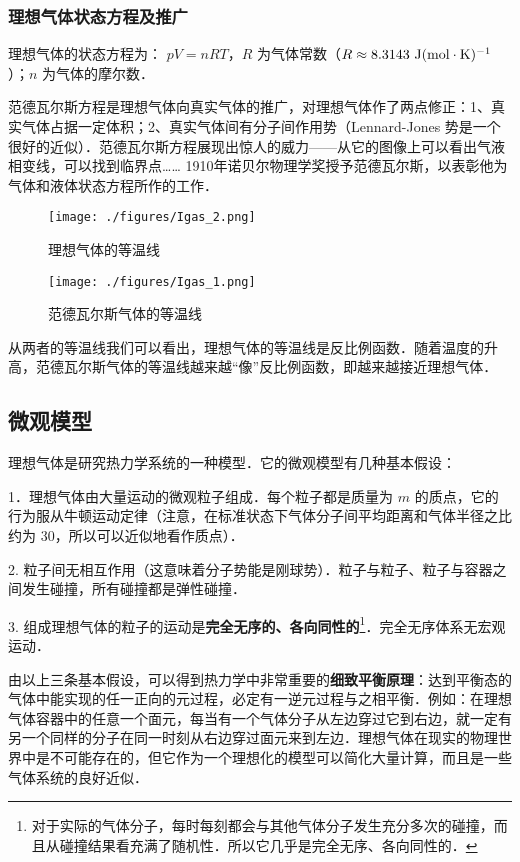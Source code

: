 \subsubsection{理想气体状态方程及推广}
理想气体的状态方程为： $pV=nRT$，$R$ 为气体常数（$R\approx 8.3143\ \rm{J}(\rm{mol\cdot K})^{-1}$）；$n$ 为气体的摩尔数．

范德瓦尔斯方程是理想气体向真实气体的推广，对理想气体作了两点修正：1、真实气体占据一定体积；2、真实气体间有分子间作用势（Lennard-Jones 势是一个很好的近似）．范德瓦尔斯方程展现出惊人的威力——从它的图像上可以看出气液相变线，可以找到临界点…… 1910年诺贝尔物理学奖授予范德瓦尔斯，以表彰他为气体和液体状态方程所作的工作．
\begin{figure}[ht]
\centering
\texttt{[image: ./figures/Igas\_2.png]}
\caption{理想气体的等温线} \label{Igas_fig1}
\end{figure}
\begin{figure}[ht]
\centering
\texttt{[image: ./figures/Igas\_1.png]}
\caption{范德瓦尔斯气体的等温线} \label{Igas_fig2}
\end{figure}

从两者的等温线我们可以看出，理想气体的等温线是反比例函数．随着温度的升高，范德瓦尔斯气体的等温线越来越“像”反比例函数，即越来越接近理想气体．
\subsection{微观模型}

理想气体是研究热力学系统的一种模型．它的微观模型有几种基本假设：

1．理想气体由大量运动的微观粒子组成．每个粒子都是质量为 $m$ 的质点，它的行为服从牛顿运动定律（注意，在标准状态下气体分子间平均距离和气体半径之比约为 $30$，所以可以近似地看作质点）．

2. 粒子间无相互作用（这意味着分子势能是刚球势）．粒子与粒子、粒子与容器之间发生碰撞，所有碰撞都是弹性碰撞．

3. 组成理想气体的粒子的运动是\textbf{完全无序的、各向同性的}\footnote{对于实际的气体分子，每时每刻都会与其他气体分子发生充分多次的碰撞，而且从碰撞结果看充满了随机性．所以它几乎是完全无序、各向同性的．}．完全无序体系无宏观运动．

由以上三条基本假设，可以得到热力学中非常重要的\textbf{细致平衡原理}：达到平衡态的气体中能实现的任一正向的元过程，必定有一逆元过程与之相平衡．例如：在理想气体容器中的任意一个面元，每当有一个气体分子从左边穿过它到右边，就一定有另一个同样的分子在同一时刻从右边穿过面元来到左边．理想气体在现实的物理世界中是不可能存在的，但它作为一个理想化的模型可以简化大量计算，而且是一些气体系统的良好近似．